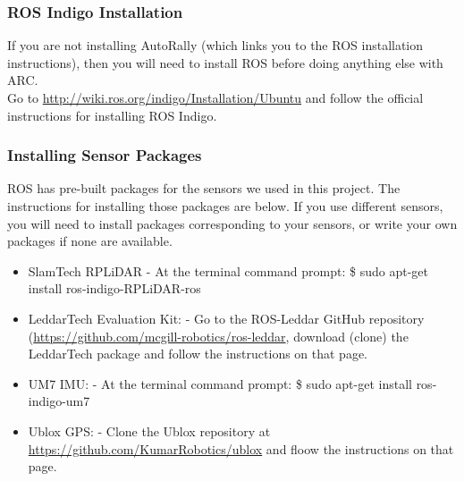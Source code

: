 \documentclass[compsoc,draftclsnofoot,onecolumn,10pt]{IEEEtran}
\begin{document}
\subsubsection{ROS Indigo Installation}
If you are not installing AutoRally (which links you to the ROS installation instructions), then you will need to install ROS before doing anything else with ARC.\\
Go to \href{http://wiki.ros.org/indigo/Installation/Ubuntu}{http://wiki.ros.org/indigo/Installation/Ubuntu} and follow the official instructions for installing ROS Indigo.

 \subsubsection{Installing Sensor Packages}
ROS has pre-built packages for the sensors we used in this project. The instructions for installing those packages are below. If you use different sensors, you will need to install packages corresponding to your sensors, or write your own packages if none are available.
 \begin{itemize}
     \item SlamTech RPLiDAR
     \subitem - At the terminal command prompt:
     \subitem \$ sudo apt-get install ros-indigo-RPLiDAR-ros
     \item LeddarTech Evaluation Kit:
     \subitem - Go to the ROS-Leddar GitHub repository (\href{https://github.com/mcgill-robotics/ros-leddar}{https://github.com/mcgill-robotics/ros-leddar}, download (clone) the LeddarTech package and follow the instructions on that page.
     \item UM7 IMU:
     \subitem - At the terminal command prompt:
     \subitem \$ sudo apt-get install ros-indigo-um7
     \item Ublox GPS:
      \subitem - Clone the Ublox repository at       \href{https://github.com/KumarRobotics/ublox}{https://github.com/KumarRobotics/ublox} and floow the instructions on that page.
\end{itemize}
\end{document}
